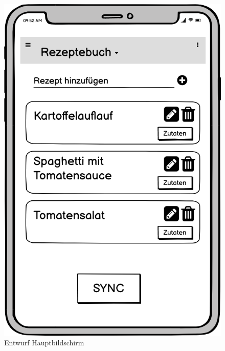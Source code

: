 \documentclass[a4paper, 12pt]{scrreprt}
\begin{document}
\begin{figure}[H]
	\centering
	\begin{minipage}{.45\textwidth}
		\centering
		\includegraphics[width=1\textwidth]{wireframeRezepte2.png}
		\caption{Entwurf Hauptbildschirm}
		\label{fig:rezepteFrame}
	\end{minipage}
	\begin{minipage}{.45\textwidth}
		\centering

\end{minipage}
\end{figure}
\end{document}
